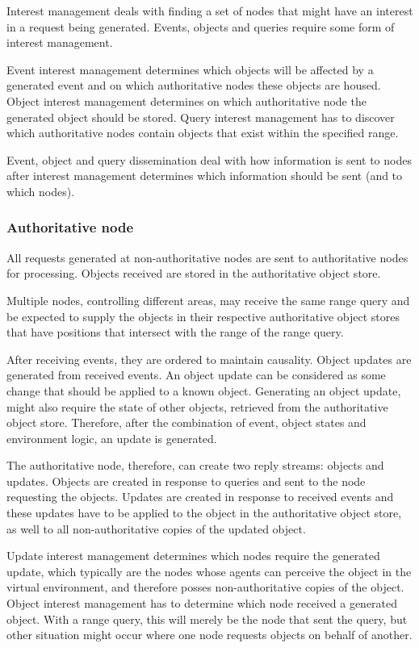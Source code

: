 Interest management deals with finding a set of nodes that might have an interest in a request being generated. Events, objects and queries require some form of interest management.

Event interest management determines which objects will be affected by a generated event and on which authoritative nodes these objects are housed. Object interest management determines on which authoritative node the generated object should be stored. Query interest management has to discover which authoritative nodes contain objects that exist within the specified range.

Event, object and query dissemination deal with how information is sent to nodes after interest management determines which information should be sent (and to which nodes).

\subsubsection{Authoritative node}

All requests generated at non-authoritative nodes are sent to authoritative nodes for processing. Objects received are stored in the authoritative object store.

Multiple nodes, controlling different areas, may receive the same range query and be expected to supply the objects in their respective authoritative object stores that have positions that intersect with the range of the range query.

After receiving events, they are ordered to maintain causality. Object updates are generated from received events. An object update can be considered as some change that should be applied to a known object. Generating an object update, might also require the state of other objects, retrieved from the authoritative object store. Therefore, after the combination of event, object states and environment logic, an update is generated.

The authoritative node, therefore, can create two reply streams: objects and updates. Objects are created in response to queries and sent to the node requesting the objects. Updates are created in response to received events and these updates have to be applied to the object in the authoritative object store, as well to all non-authoritative copies of the updated object.

Update interest management determines which nodes require the generated update, which typically are the nodes whose agents can perceive the object in the virtual environment, and therefore posses non-authoritative copies of the object. Object interest management has to determine which node received a generated object. With a range query, this will merely be the node that sent the query, but other situation might occur where one node requests objects on behalf of another.

